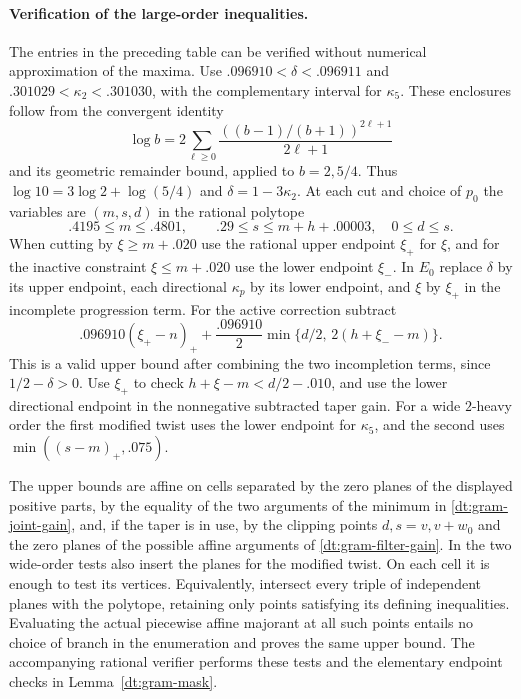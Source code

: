 \documentclass[11pt,a4paper]{article}
\theoremstyle{paperplain}
\numberwithin{equation}{section}
\begin{document}
\paragraph{Verification of the large-order inequalities.}
The entries in the preceding table can be verified
without numerical approximation of the maxima.
Use \(.096910<\delta<.096911\) and
\(.301029<\kappa_2<.301030\), with the complementary
interval for \(\kappa_5\).
These enclosures follow from the convergent identity
\[
 \log b=2\sum_{\ell\ge0}
                 \frac{((b-1)/(b+1))^{2\ell+1}}{2\ell+1}
\]
and its geometric remainder bound, applied to \(b=2,5/4\).
Thus \(\log10=3\log2+\log(5/4)\) and \(\delta=1-3\kappa_2\).
At each cut and choice of \(p_0\) the variables are
\((m,s,d)\) in the rational polytope
\[
 .4195\le m\le.4801,\qquad .29\le s\le m+h+.00003,
                                              \quad 0\le d\le s.
\]
When cutting by \(\xi\ge m+.020\) use the rational upper
endpoint \(\xi_+\) for \(\xi\), and for the inactive
constraint \(\xi\le m+.020\) use the lower endpoint
\(\xi_-\). In \(E_0\) replace \(\delta\) by its upper
endpoint, each directional \(\kappa_p\) by its lower
endpoint, and \(\xi\) by \(\xi_+\) in the incomplete
progression term. For the active correction subtract
\[
 .096910(\xi_+-n)_+
 +\frac{.096910}{2}\min\{d/2,\,2(h+\xi_--m)\}.
\]
This is a valid upper bound after combining the two
incompletion terms, since \(1/2-\delta>0\).
Use \(\xi_+\) to check \(h+\xi-m<d/2-.010\),
and use the lower directional endpoint in the
nonnegative subtracted taper gain. For a wide \(2\)-heavy
order the first modified twist uses the lower endpoint
for \(\kappa_5\), and the second uses
\(\min((s-m)_+,.075)\).

The upper bounds are affine on cells separated by the
zero planes of the displayed positive parts, by
the equality of the two arguments of the minimum in
\eqref{dt:gram-joint-gain}, and, if the taper is in use,
by the clipping points \(d,s=v,v+w_0\) and the zero
planes of the possible affine arguments of
\eqref{dt:gram-filter-gain}. In the two wide-order tests
also insert the planes for the modified twist.
On each cell it is enough to test its vertices.
Equivalently, intersect every triple of independent
planes with the polytope, retaining only points satisfying
its defining inequalities. Evaluating the actual
piecewise affine majorant at all such points entails no
choice of branch in the enumeration and proves the same
upper bound. The accompanying rational verifier
 performs
these tests and the elementary endpoint checks
in Lemma~\ref{dt:gram-mask}.
\end{document}
